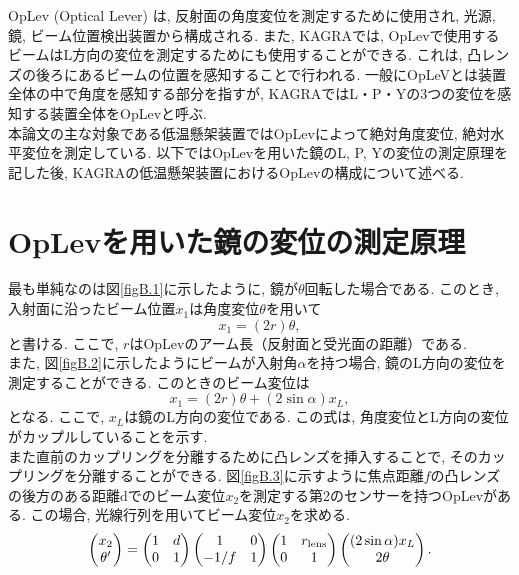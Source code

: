 OpLev (Optical Lever) は, 反射面の角度変位を測定するために使用され, 光源, 鏡, ビーム位置検出装置から構成される. また, KAGRAでは, OpLevで使用するビームはL方向の変位を測定するためにも使用することができる. これは, 凸レンズの後ろにあるビームの位置を感知することで行われる. 一般にOpLeVとは装置全体の中で角度を感知する部分を指すが, KAGRAではL・P・Yの3つの変位を感知する装置全体をOpLevと呼ぶ. \\
\quad 本論文の主な対象である低温懸架装置ではOpLevによって絶対角度変位, 絶対水平変位を測定している. 以下ではOpLevを用いた鏡のL, P, Yの変位の測定原理を記した後, KAGRAの低温懸架装置におけるOpLevの構成について述べる. 
\section{OpLevを用いた鏡の変位の測定原理}
\label{secB.1}
最も単純なのは図\ref{figB.1}に示したように, 鏡が$\theta$回転した場合である. このとき, 入射面に沿ったビーム位置$x_1$は角度変位$\theta$を用いて
\begin{equation}
x_1=(2r)\theta,
\end{equation}
と書ける. ここで, $r$はOpLevのアーム長（反射面と受光面の距離）である. \\
\quad また, 図\ref{figB.2}に示したようにビームが入射角$\alpha$を持つ場合, 鏡のL方向の変位を測定することができる. このときのビーム変位は
\begin{equation}
x_1=(2r)\theta+(2\sin\alpha)x_L,
\label{eqB.2}
\end{equation}
となる. ここで, $x_L$は鏡のL方向の変位である. この式は, 角度変位とL方向の変位がカップルしていることを示す. \\
\quad また直前のカップリングを分離するために凸レンズを挿入することで, そのカップリングを分離することができる. 図\ref{figB.3}に示すように焦点距離$f$の凸レンズの後方のある距離dでのビーム変位$x_2$を測定する第2のセンサーを持つOpLevがある. この場合, 光線行列を用いてビーム変位$x_2$を求める. 
\begin{equation}
\begin{pmatrix}
x_2\\
\theta^{\prime}
\end{pmatrix}
=\begin{pmatrix}
1&d\\
0&1
\end{pmatrix}
\begin{pmatrix}
1&0\\
-1/f&1
\end{pmatrix}
\begin{pmatrix}
1&r_{\rm lens}\\
0&1
\end{pmatrix}
\begin{pmatrix}
(2\sin\alpha)x_L\\
2\theta
\end{pmatrix}.
\end{equation}
